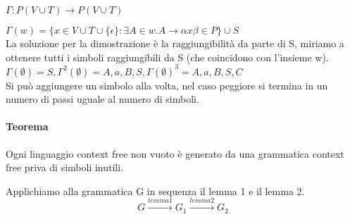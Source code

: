 \documentclass[a4paper, 10pt]{report}
\begin{document}
\begin{tcolorbox}[title=\textbf{Dimostrazione}]
$\Gamma: P(V \cup T) \rightarrow P(V \cup T)$

$\Gamma(w) = \{x \in V \cup T \cup \{\epsilon\} : \exists A \in w . A \rightarrow \alpha x \beta \in P\} \cup {S}$\\

La soluzione per la dimostrazione è la raggiungibilità da parte di S, miriamo a ottenere tutti i simboli raggiungibili da S (che coincidono con l'insieme w).\\

$\Gamma(\emptyset) = {S}, \Gamma^2(\emptyset) = {A, a, B, S}, \Gamma(\emptyset)^3 = {A, a, B, S, C}$\\

Si può aggiungere un simbolo alla volta, nel caso peggiore si termina in un numero di passi uguale al numero di simboli.
\end{tcolorbox}

\paragraph*{Teorema} Ogni linguaggio context free non vuoto è generato da una grammatica context free priva di simboli inutili.

\begin{tcolorbox}[title=\textbf{Dimostrazione}]
Applichiamo alla grammatica G in sequenza il lemma 1 e il lemma 2. 
	\[
		G\xrightarrow{lemma 1}G_1\xrightarrow{lemma 2}G_2
	\]\end{tcolorbox}
\end{document}
